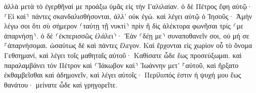 \documentclass{openreader}
\begin{document}
ἀλλὰ μετὰ τὸ ἐγερθῆναί με προάξω ὑμᾶς εἰς τὴν Γαλιλαίαν. 
ὁ δὲ Πέτρος ἔφη αὐτῷ· ⸂Εἰ καὶ⸃ πάντες σκανδαλισθήσονται, ἀλλ’ οὐκ ἐγώ. 
καὶ λέγει αὐτῷ ὁ Ἰησοῦς· Ἀμὴν λέγω σοι ὅτι σὺ σήμερον ⸂ταύτῃ τῇ νυκτὶ⸃ πρὶν ἢ δὶς ἀλέκτορα φωνῆσαι τρίς ⸂με ἀπαρνήσῃ⸃. 
ὁ δὲ ⸂ἐκπερισσῶς ἐλάλει⸃· Ἐὰν ⸂δέῃ με⸃ συναποθανεῖν σοι, οὐ μή σε ⸀ἀπαρνήσομαι. ὡσαύτως δὲ καὶ πάντες ἔλεγον. 
Καὶ ἔρχονται εἰς χωρίον οὗ τὸ ὄνομα Γεθσημανί, καὶ λέγει τοῖς μαθηταῖς αὐτοῦ· Καθίσατε ὧδε ἕως προσεύξωμαι. 
καὶ παραλαμβάνει τὸν Πέτρον καὶ ⸂Ἰάκωβον καὶ⸃ Ἰωάννην μετ’ ⸀αὐτοῦ, καὶ ἤρξατο ἐκθαμβεῖσθαι καὶ ἀδημονεῖν, 
καὶ λέγει αὐτοῖς· Περίλυπός ἐστιν ἡ ψυχή μου ἕως θανάτου· μείνατε ὧδε καὶ γρηγορεῖτε. 
\end{document}

